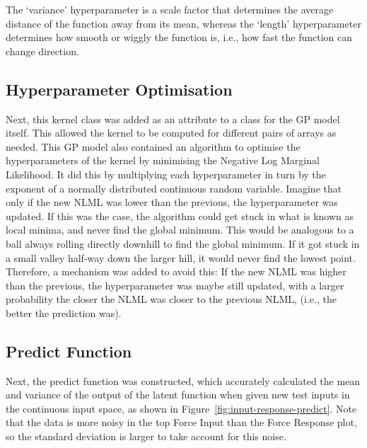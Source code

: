 \documentclass[12pt]{article}
\begin{document}
    The `variance' hyperparameter is a scale factor that determines the average distance of the function away from its mean, whereas the `length' hyperparameter determines how smooth or wiggly the function is, i.e., how fast the function can change direction.

    \subsection{Hyperparameter Optimisation}
    Next, this kernel class was added as an attribute to a class for the GP model itself.
    This allowed the kernel to be computed for different pairs of arrays as needed.
    This GP model also contained an algorithm to optimise the hyperparameters of the kernel by minimising the Negative Log Marginal Likelihood.
    It did this by multiplying each hyperparameter in turn by the exponent of a normally distributed continuous random variable.
    Imagine that only if the new NLML was lower than the previous, the hyperparameter was updated.
    If this was the case, the algorithm could get stuck in what is known as local minima, and never find the global minimum.
    This would be analogous to a ball always rolling directly downhill to find the global minimum.
    If it got stuck in a small valley half-way down the larger hill, it would never find the lowest point.
    Therefore, a mechanism was added to avoid this:
    If the new NLML was higher than the previous, the hyperparameter was maybe still updated, with a larger probability the closer the NLML was closer to the previous NLML, (i.e., the better the prediction was).

    \subsection{Predict Function}
    Next, the predict function was constructed, which accurately calculated the mean and variance of the output of the latent function when given new test inputs in the continuous input space, as shown in Figure~\ref{fig:input-response-predict}.
    Note that the data is more noisy in the top Force Input than the Force Response plot, so the standard deviation is larger to take account for this noise.
\end{document}
